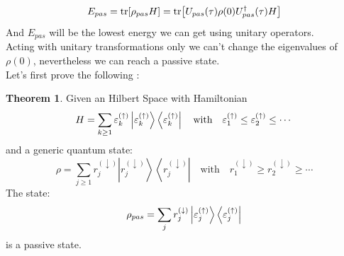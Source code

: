\documentclass[12pt,a4paper]{book}
\theoremstyle{definition}
\newtheorem{theorem}{Theorem}[section]
\begin{document}
\begin{equation}
	 E_{pas}=\tr[ \rho_{pas}H]=\tr[U_{pas}(\tau)\rho(0)U_{pas}^\dagger(\tau) H]
\end{equation}
And $E_{pas}$ will be the lowest energy we can get using unitary operators.\\
Acting with unitary transformations only we can't change the eigenvalues of $\rho(0)$, nevertheless we can reach a passive state. \\ Let's first prove the following  \cite{harrell2013course}:
\begin{theorem}\label{theo:passive}
Given an Hilbert Space with Hamiltonian 
\begin{equation}
	H=\sum_{k \geq 1} \varepsilon_{k}^{(\uparrow)}\ket{\varepsilon_{k}^{(\uparrow)}}\bra{\varepsilon_{k}^{(\uparrow)}} \quad \text{with} \quad \varepsilon_{1}^{(\uparrow)} \leq \varepsilon_{2}^{(\uparrow)} \leq \cdots
\end{equation}
and a generic quantum state:
\begin{equation}
	\rho=\sum_{j \geq 1} r_{j}^{(\downarrow)}\left|r_{j}^{(\downarrow)}\right\rangle\left\langle r_{j}^{(\downarrow)}\right| \quad \text{with} \quad  r_{1}^{(\downarrow)} \geq r_{2}^{(\downarrow)} \geq \cdots
\end{equation}
The state:
\begin{equation}\label{eq:rhopas}
	\rho_{pas}=\sum_{j} r_{j}^{(\downarrow)}\ket{\varepsilon_{j}^{(\uparrow)}}\bra{\varepsilon_{j}^{(\uparrow)}}
\end{equation}
is a passive state.
\end{theorem}
\end{document}
